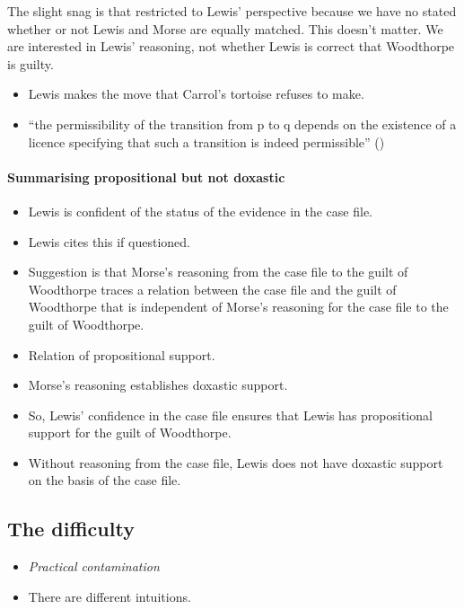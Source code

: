 \documentclass[10pt]{article}
\newcommand{\hozlinedash}[0]{%
  \noindent\hdashrule[0.5ex][c]{\textwidth}{.1pt}{2.5pt}
}
\begin{document}
The slight snag is that restricted to Lewis' perspective because we have no stated whether or not Lewis and Morse are equally matched.
This doesn't matter.
We are interested in Lewis' reasoning, not whether Lewis is correct that Woodthorpe is guilty.

\hozlinedash

\begin{itemize}
\item Lewis makes the move that Carrol's tortoise refuses to make.
\item ``the permissibility of the transition from p to q depends on the existence of a licence specifying that such a transition is indeed permissible'' (\cite[459]{Simchen:2001aa})
\end{itemize}

\hozlinedash

\paragraph{Summarising propositional but not doxastic}

\begin{itemize}
\item Lewis is confident of the status of the evidence in the case file.
\item Lewis cites this if questioned.
\item Suggestion is that Morse's reasoning from the case file to the guilt of Woodthorpe traces a relation between the case file and the guilt of Woodthorpe that is independent of Morse's reasoning for the case file to the guilt of Woodthorpe.
\item Relation of propositional support.
\item Morse's reasoning establishes doxastic support.
\item So, Lewis' confidence in the case file ensures that Lewis has propositional support for the guilt of Woodthorpe.
\item Without reasoning from the case file, Lewis does not have doxastic support on the basis of the case file.
\end{itemize}

\newpage

\subsection{The difficulty}
\label{sec:difficulty}

\begin{itemize}
\item \emph{Practical contamination}
\item There are different intuitions.
\end{itemize}
\end{document}

